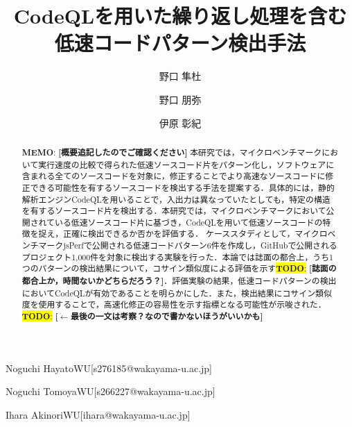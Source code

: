 \documentclass[submit,techrep,noauthor]{ipsj}
\newcommand{\todo}[1]{\colorbox{yellow}{{\bf TODO}:}{\color{red} {\textbf{[#1]}}}}
\newcommand{\memo}[1]{\colorbox{magenta!30}{{\bf MEMO}:}{\color{red!50} {\textbf{[#1]}}}}
\begin{document}
\title{CodeQLを用いた繰り返し処理を含む
\\
低速コードパターン検出手法
}


\author{野口 隼杜}{Noguchi Hayato}{WU}[s276185@wakayama-u.ac.jp]
\author{野口 朋弥}{Noguchi Tomoya}{WU}[s266227@wakayama-u.ac.jp]
\author{伊原 彰紀}{Ihara Akinori}{WU}[ihara@wakayama-u.ac.jp]

\begin{abstract}
\memo{概要追記したのでご確認ください}
本研究では，マイクロベンチマークにおいて実行速度の比較で得られた低速ソースコード片をパターン化し，ソフトウェアに含まれる全てのソースコードを対象に，修正することでより高速なソースコードに修正できる可能性を有するソースコードを検出する手法を提案する．具体的には，静的解析エンジンCodeQLを用いることで，入出力は異なっていたとしても，特定の構造を有するソースコード片を検出する．本研究では，マイクロベンチマークにおいて公開されている低速ソースコード片に基づき，CodeQLを用いて低速ソースコードの特徴を捉え，正確に検出できるか否かを評価する．
ケーススタディとして，マイクロベンチマークjsPerfで公開される低速コードパターン6件を作成し，GitHubで公開されるプロジェクト1,000件を対象に検出する実験を行った．本論では誌面の都合上，うち1つのパターンの検出結果について，コサイン類似度による評価を示す\todo{誌面の都合上か，時間ないかどちらだろう？}．評価実験の結果，低速コードパターンの検出においてCodeQLが有効であることを明らかにした．また，検出結果にコサイン類似度を使用することで，高速化修正の容易性を示す指標となる可能性が示唆された．\todo{$\leftarrow$最後の一文は考察？なので書かないほうがいいかも}

\end{abstract}
\end{document}
